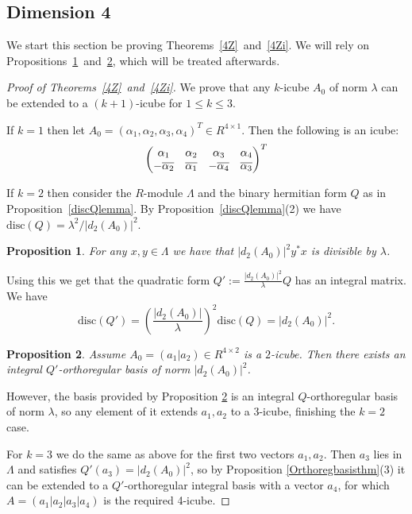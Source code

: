 \documentclass[11pt]{amsart}
\newcommand{\disc}{\mathrm{disc}}
\newtheorem{proposition}{Proposition}[section]
\theoremstyle{definition}
\theoremstyle{remark}
\begin{document}
\subsection{Dimension 4} We start this section be proving Theorems~\ref{4Z}~and~\ref{4Zi}. We will rely on Propositions~\ref{d2yx}~and~\ref{sumsquared4}, which will be treated afterwards.
\begin{proof}[Proof of Theorems~\ref{4Z}~and~\ref{4Zi}]
We prove that any $k$-icube $A_0$ of norm $\lambda$ can be extended to a $(k+1)$-icube for $1\leq k\leq 3$.

If $k=1$ then let $A_0=(\alpha_1,\alpha_2,\alpha_3,\alpha_4)^T\in R^{4\times 1}$. Then the following is an icube:
\begin{equation}\label{{eq:1-icube-to-2-icube-in-Z[i]4}}
\begin{pmatrix}\alpha_1 & \alpha_2 & \alpha_3 & \alpha_4\\ -\overline{\alpha_2} & \overline{\alpha_1} & -\overline{\alpha_4} & \overline{\alpha_3}\end{pmatrix}^T
\end{equation}

If $k=2$ then consider the $R$-module $\Lambda$ and the binary hermitian form $Q$ as in Proposition~\ref{discQlemma}. By Proposition~\ref{discQlemma}(2) we have $\disc(Q)=\lambda^2/|d_2(A_0)|^2$. 

\begin{proposition}\label{d2yx}
For any $x,y\in\Lambda$ we have that $|d_2(A_0)|^2y^*x$ is divisible by $\lambda$.
\end{proposition}

Using this we get that the quadratic form $Q':=\frac{|d_2(A_0)|^2}\lambda Q$ has an integral matrix. We have
\begin{equation}\label{discQprime}
\disc(Q')=\left(\frac{|d_2(A_0)|}{\lambda}\right)^2\disc(Q)=|d_2(A_0)|^2.
\end{equation}


\begin{proposition}\label{sumsquared4}
Assume $A_0=(a_1|a_2)\in R^{4\times 2}$ is a $2$-icube. Then there exists an integral $Q'$-orthoregular basis of norm $|d_2(A_0)|^2$. 
\end{proposition}

However, the basis provided by Proposition \ref{sumsquared4} is an integral $Q$-orthoregular basis of norm $\lambda$, so any element of it extends $a_1,a_2$ to a 3-icube, finishing the $k=2$ case.

For $k=3$ we do the same as above for the first two vectors $a_1, a_2$. Then $a_3$ lies in $\Lambda$ and satisfies $Q'(a_3)=|d_2(A_0)|^2$, so by Proposition \ref{Orthoregbasisthm}(3) it can be extended to a $Q'$-orthoregular integral basis with a vector $a_4$, for which $A=(a_1|a_2|a_3|a_4)$ is the required 4-icube.
\end{proof}
\end{document}

